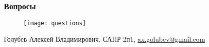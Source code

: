 \begin{frame}
    \frametitle{Вопросы}
    \begin{minipage}{0.3\textwidth}
        \begin{figure}[ht!]
            \centering
            \texttt{[image: questions]}
        \end{figure}
    \end{minipage}
    \begin{minipage}{0.6\textwidth}
        \begin{center}
            Голубев Алексей Владимирович, САПР-2п1,
            \href{mailto:ax.golubev@gmail.com}{ax.golubev@gmail.com}
        \end{center}
    \end{minipage}
\end{frame}